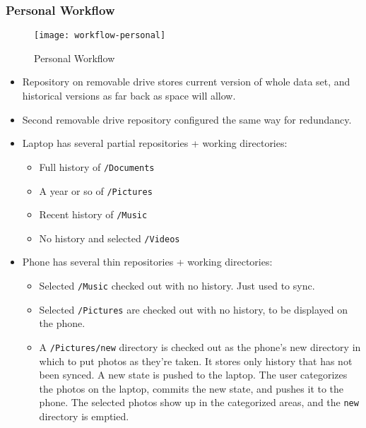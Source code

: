 \documentclass[a4paper]{article}
\begin{document}
\subsubsection{Personal Workflow}

  \begin{figure}[h]
    \caption{Personal Workflow}
    \label{fig:workflow-personal}
    \centering
      \texttt{[image: workflow-personal]}
  \end{figure}

  \begin{itemize}
  \item
    Repository on removable drive stores current version of whole data
    set, and historical versions as far back as space will allow.
  \item
    Second removable drive repository configured the same way for
    redundancy.
  \item
    Laptop has several partial repositories + working directories:

    \begin{itemize}
    \item
      Full history of \texttt{/Documents}
    \item
      A year or so of \texttt{/Pictures}
    \item
      Recent history of \texttt{/Music}
    \item
      No history and selected \texttt{/Videos}
    \end{itemize}
  \item
    Phone has several thin repositories + working directories:

    \begin{itemize}
    \item
      Selected \texttt{/Music} checked out with no history. Just used to
      sync.
    \item
      Selected \texttt{/Pictures} are checked out with no history, to be
      displayed on the phone.
    \item
      A \texttt{/Pictures/new} directory is checked out as the phone's
      new directory in which to put photos as they're taken. It stores
      only history that has not been synced. A new state is pushed to
      the laptop. The user categorizes the photos on the laptop, commits
      the new state, and pushes it to the phone. The selected photos
      show up in the categorized areas, and the \texttt{new} directory
      is emptied.
    \end{itemize}
  \end{itemize}
\end{document}
